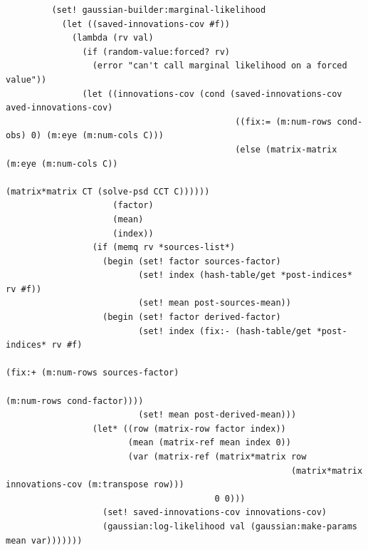\documentclass{article}
\begin{document}
\begin{verbatim}
         (set! gaussian-builder:marginal-likelihood
           (let ((saved-innovations-cov #f))
             (lambda (rv val)
               (if (random-value:forced? rv)
                 (error "can't call marginal likelihood on a forced value"))
               (let ((innovations-cov (cond (saved-innovations-cov
aved-innovations-cov)
                                             ((fix:= (m:num-rows cond-obs) 0) (m:eye (m:num-cols C)))
                                             (else (matrix-matrix (m:eye (m:num-cols C))
                                                                  (matrix*matrix CT (solve-psd CCT C))))))
                     (factor)
                     (mean)
                     (index))
                 (if (memq rv *sources-list*)
                   (begin (set! factor sources-factor)
                          (set! index (hash-table/get *post-indices* rv #f))
                          (set! mean post-sources-mean))
                   (begin (set! factor derived-factor)
                          (set! index (fix:- (hash-table/get *post-indices* rv #f)
                                                                    (fix:+ (m:num-rows sources-factor)
                                                                           (m:num-rows cond-factor))))
                          (set! mean post-derived-mean)))
                 (let* ((row (matrix-row factor index))
                        (mean (matrix-ref mean index 0))
                        (var (matrix-ref (matrix*matrix row
                                                        (matrix*matrix innovations-cov (m:transpose row)))
                                         0 0)))
                   (set! saved-innovations-cov innovations-cov)
                   (gaussian:log-likelihood val (gaussian:make-params mean var)))))))


\end{verbatim}
\end{document}
